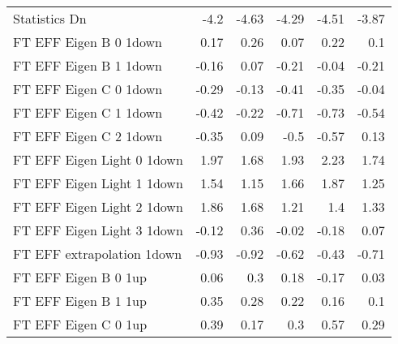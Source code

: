 \begin{table}[htbp]
{\begin{tabular}{lrrrrr}
Statistics Dn                             & -4.2               & -4.63                & -4.29                & -4.51                & -3.87                \\
FT EFF Eigen B 0  1down      & 0.17               & 0.26                 & 0.07                 & 0.22                 & 0.1                  \\
FT EFF Eigen B 1  1down      & -0.16              & 0.07                 & -0.21                & -0.04                & -0.21                \\
FT EFF Eigen C 0  1down      & -0.29              & -0.13                & -0.41                & -0.35                & -0.04                \\
FT EFF Eigen C 1  1down      & -0.42              & -0.22                & -0.71                & -0.73                & -0.54                \\
FT EFF Eigen C 2  1down      & -0.35              & 0.09                 & -0.5                 & -0.57                & 0.13                 \\
FT EFF Eigen Light 0  1down  & 1.97               & 1.68                 & 1.93                 & 2.23                 & 1.74                 \\
FT EFF Eigen Light 1  1down  & 1.54               & 1.15                 & 1.66                 & 1.87                 & 1.25                 \\
FT EFF Eigen Light 2  1down  & 1.86               & 1.68                 & 1.21                 & 1.4                  & 1.33                 \\
FT EFF Eigen Light 3  1down  & -0.12              & 0.36                 & -0.02                & -0.18                & 0.07                 \\
FT EFF extrapolation  1down    & -0.93              & -0.92                & -0.62                & -0.43                & -0.71                \\
FT EFF Eigen B 0  1up        & 0.06               & 0.3                  & 0.18                 & -0.17                & 0.03                 \\
FT EFF Eigen B 1  1up        & 0.35               & 0.28                 & 0.22                 & 0.16                 & 0.1                  \\
FT EFF Eigen C 0  1up        & 0.39               & 0.17                 & 0.3                  & 0.57                 & 0.29                 \\

\end{tabular}}
\end{table}
